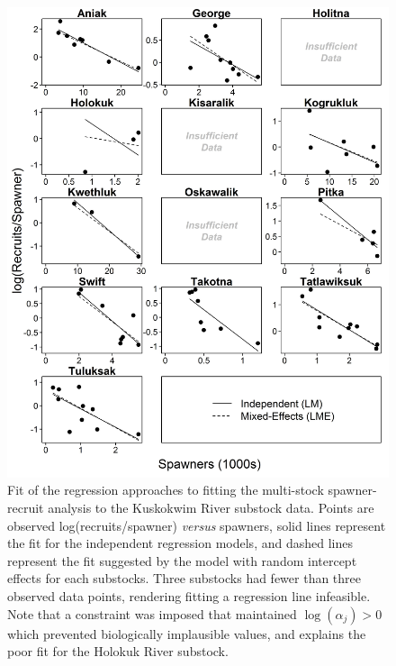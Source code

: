 \documentclass[12pt,]{book}
\theoremstyle{definition}
\theoremstyle{definition}
\theoremstyle{definition}
\theoremstyle{remark}
\begin{document}
\clearpage

\begin{figure}
  \centering
  \includegraphics{img/Ch4/RPS-v-S.jpg}
  \caption{Fit of the regression approaches to fitting the multi-stock spawner-recruit analysis to the Kuskokwim River substock data. Points are observed log(recruits/spawner) \textit{versus} spawners, solid lines represent the fit for the independent regression models, and dashed lines represent the fit suggested by the model with random intercept effects for each substocks. Three substocks had fewer than three observed data points, rendering fitting a regression line infeasible. Note that a constraint was imposed that maintained $\log(\alpha_{j}) > 0$ which prevented biologically implausible values, and explains the poor fit for the Holokuk River substock.}
  \label{fig:rps-v-s}
\end{figure}

\clearpage
\end{document}

